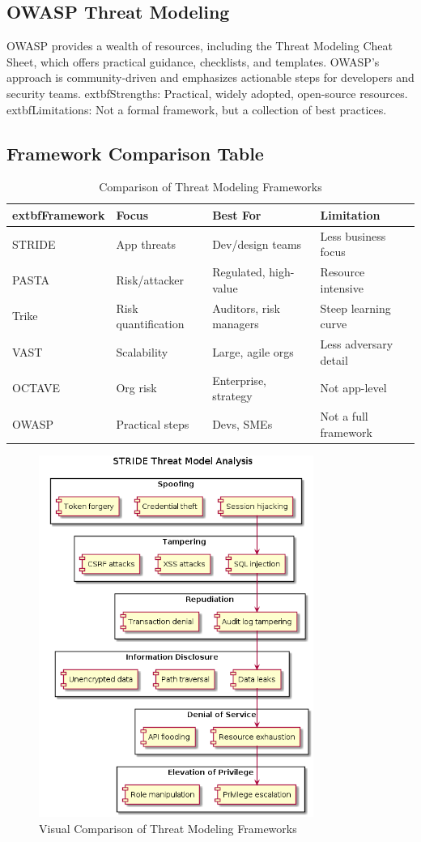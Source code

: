 \subsection*{OWASP Threat Modeling}
OWASP provides a wealth of resources, including the Threat Modeling Cheat Sheet, which offers practical guidance, checklists, and templates. OWASP’s approach is community-driven and emphasizes actionable steps for developers and security teams.\cite{owasp}
	extbf{Strengths:} Practical, widely adopted, open-source resources.\\
	extbf{Limitations:} Not a formal framework, but a collection of best practices.

\subsection*{Framework Comparison Table}
\begin{table}[H]
\centering
\begin{tabular}{|l|l|l|l|}
\hline
	extbf{Framework} & \textbf{Focus} & \textbf{Best For} & \textbf{Limitation} \\
\hline
STRIDE & App threats & Dev/design teams & Less business focus \\
PASTA & Risk/attacker & Regulated, high-value & Resource intensive \\
Trike & Risk quantification & Auditors, risk managers & Steep learning curve \\
VAST & Scalability & Large, agile orgs & Less adversary detail \\
OCTAVE & Org risk & Enterprise, strategy & Not app-level \\
OWASP & Practical steps & Devs, SMEs & Not a full framework \\
\hline
\end{tabular}
\caption{Comparison of Threat Modeling Frameworks\cite{owasp,uceda2015,nist800154}}
\end{table}

\begin{figure}[H]
	\centering
	\includegraphics[width=0.8\textwidth]{images/stride-analysis}
	\caption{Visual Comparison of Threat Modeling Frameworks}
\end{figure}
